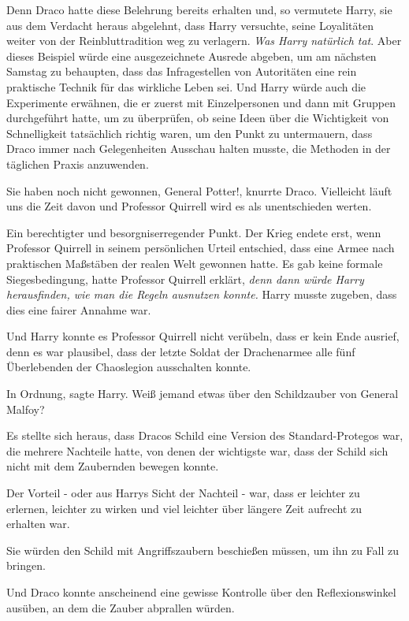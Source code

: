 Denn Draco hatte diese Belehrung bereits erhalten und, so vermutete Harry, sie
aus dem Verdacht heraus abgelehnt, dass Harry versuchte, seine Loyalitäten
weiter von der Reinbluttradition weg zu verlagern. \emph{Was Harry natürlich
tat}. Aber dieses Beispiel würde eine ausgezeichnete Ausrede abgeben, um am
nächsten Samstag zu behaupten, dass das Infragestellen von Autoritäten eine rein
praktische Technik für das wirkliche Leben sei. Und Harry würde auch die
Experimente erwähnen, die er zuerst mit Einzelpersonen und dann mit Gruppen
durchgeführt hatte, um zu überprüfen, ob seine Ideen über die Wichtigkeit von
Schnelligkeit tatsächlich richtig waren, um den Punkt zu untermauern, dass Draco
immer nach Gelegenheiten Ausschau halten musste, die Methoden in der täglichen
Praxis anzuwenden.

\glqq{}Sie haben noch nicht gewonnen, General Potter!\grqq{}, knurrte Draco.
\glqq{}Vielleicht läuft uns die Zeit davon und Professor Quirrell wird es als
unentschieden werten.\grqq{}

Ein berechtigter und besorgniserregender Punkt. Der Krieg endete erst, wenn
Professor Quirrell in seinem persönlichen Urteil entschied, dass eine Armee nach
praktischen Maßstäben der realen Welt gewonnen hatte. Es gab keine formale
Siegesbedingung, hatte Professor Quirrell erklärt, \emph{denn dann würde Harry
herausfinden, wie man die Regeln ausnutzen konnte.} Harry musste zugeben, dass
dies eine fairer Annahme war.

Und Harry konnte es Professor Quirrell nicht verübeln, dass er kein Ende
ausrief, denn es war plausibel, dass der letzte Soldat der Drachenarmee alle
fünf Überlebenden der Chaoslegion ausschalten konnte.

\glqq{}In Ordnung\grqq{}, sagte Harry. \glqq{}Weiß jemand etwas über den
Schildzauber von General Malfoy?\grqq{}

Es stellte sich heraus, dass Dracos Schild eine Version des Standard-Protegos
war, die mehrere Nachteile hatte, von denen der wichtigste war, dass der Schild
sich nicht mit dem Zaubernden bewegen konnte.

Der Vorteil - oder aus Harrys Sicht der Nachteil - war, dass er leichter zu
erlernen, leichter zu wirken und viel leichter über längere Zeit aufrecht zu
erhalten war.

Sie würden den Schild mit Angriffszaubern beschießen müssen, um ihn zu Fall zu
bringen.

Und Draco konnte anscheinend eine gewisse Kontrolle über den Reflexionswinkel
ausüben, an dem die Zauber abprallen würden.

